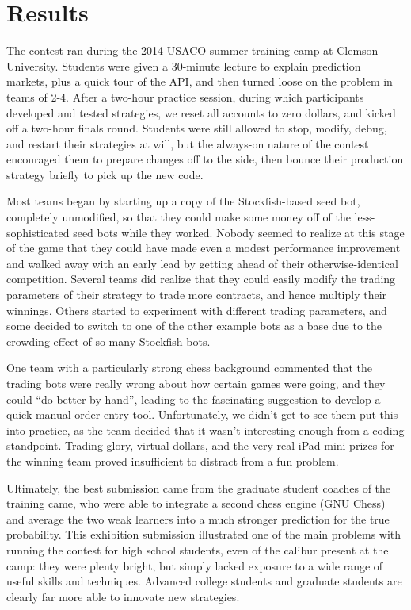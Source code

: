 \documentclass{article}
\begin{document}
\section{Results}

The contest ran during the 2014 USACO summer training camp at Clemson University.
Students were given a 30-minute lecture to explain prediction markets, plus a quick tour of the API,
and then turned loose on the problem in teams of 2-4. After a two-hour practice session, during
which participants developed and tested strategies, we reset all accounts to zero dollars, and
kicked off a two-hour finals round. Students were still allowed to stop, modify, debug, and restart
their strategies at will, but the always-on nature of the contest encouraged them to prepare changes
off to the side, then bounce their production strategy briefly to pick up the new code.

Most teams began by starting up a copy of the Stockfish-based seed bot, completely unmodified, so
that they could make some money off of the less-sophisticated seed bots while they worked. Nobody
seemed to realize at this stage of the game that they could have made even a modest performance
improvement and walked away with an early lead by getting ahead of their otherwise-identical
competition. Several teams did realize that they could easily modify the trading parameters of their
strategy to trade more contracts, and hence multiply their winnings. Others started to experiment
with different trading parameters, and some decided to switch to one of the other example bots as a
base due to the crowding effect of so many Stockfish bots.

One team with a particularly strong chess background commented that the trading bots were really
wrong about how certain games were going, and they could ``do better by hand'', leading to the
fascinating suggestion to develop a quick manual order entry tool. Unfortunately, we didn't get to
see them put this into practice, as the team decided that it wasn't interesting enough from a coding
standpoint. Trading glory, virtual dollars, and the very real iPad mini prizes for the winning team
proved insufficient to distract from a fun problem.

Ultimately, the best submission came from the graduate student coaches of the training came, who
were able to integrate a second chess engine (GNU Chess) and average the two weak learners into a
much stronger prediction for the true probability. This exhibition submission illustrated one of the
main problems with running the contest for high school students, even of the calibur present at the
camp: they were plenty bright, but simply lacked exposure to a wide range of useful skills and
techniques. Advanced college students and graduate students are clearly far more able to innovate
new strategies.
\end{document}
